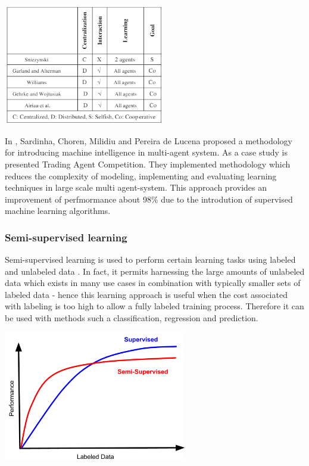 \begin{table}[H]
	\centering
	\includegraphics[width=7cm, keepaspectratio]{diagrams/related_work/Supervised_learners_vs_learning_aspects}
	\center
	\label{tab:LearningAspects}
\end{table}


In \cite{SLSardinha2004EngineeringML}, Sardinha, Choren, Milidiu and Pereira de Lucena proposed a methodology for introducing machine intelligence in multi-agent system. As a case study is presented Trading Agent Competition. They implemented methodology which reduces the complexity of modeling, implementing and evaluating learning techniques in large scale multi agent-system. This approach provides an improvement of perfmormance about 98\% due to the introdution of supervised machine learning algorithms. 




\subsubsection{Semi-supervised learning}

Semi-supervised learning is used to perform certain learning tasks using labeled and unlabeled data  \cite{SemiSupervisedLearning1}. In fact, it permits harnessing the large amounts of unlabeled data which exists in many use cases in combination with typically smaller sets of labeled data - hence this learning approach is useful when the cost associated with labeling is too high to allow a fully labeled training process. Therefore it can be used with methods such a classification, regression and prediction. 

\begin{center}
	\includegraphics[width=8cm, keepaspectratio]{diagrams/semi_supervised}
	\center
	\label{fig:SemiSupervisedLearning}
\end{center}

